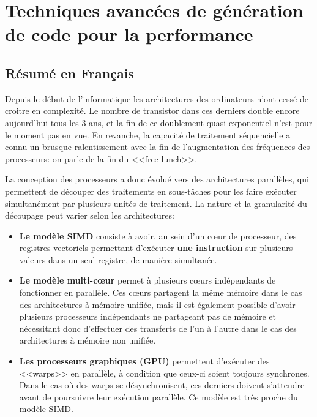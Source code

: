 \documentclass[main]{subfiles}
\begin{document}
\chapter*{Techniques avanc\'ees de g\'en\'eration de code pour la performance}

\section*{R\'esum\'e en Fran\c{c}ais}

Depuis le d\'ebut de l'informatique les architectures des ordinateurs n'ont
cess\'e de croitre en complexit\'e. Le nombre de transistor dans ces derniers
double encore aujourd'hui tous les 3 ans, et la fin de ce doublement
quasi-exponentiel n'est pour le moment pas en vue.
En revanche, la capacit\'e de traitement s\'equencielle a connu un brusque
ralentissement avec la fin de l'augmentation des fr\'equences des processeurs:
on parle de la fin du <<free lunch>>.

La conception des processeurs a donc \'evolu\'e vers des architectures
parall\`eles, qui permettent de d\'ecouper des traitements en sous-t\^aches
pour les faire ex\'ecuter simultan\'ement par plusieurs unit\'es de traitement.
La nature et la granularit\'e du d\'ecoupage peut varier selon les
architectures:

\begin{itemize}
\item
\textbf{Le mod\`ele SIMD} consiste \`a avoir, au sein d'un c\oe{}ur de
processeur, des registres vectoriels permettant d'ex\'ecuter
\textbf{une instruction} sur plusieurs valeurs dans un seul registre,
de mani\`ere simultan\'ee.

\item
\textbf{Le mod\`ele multi-c\oe{}ur} permet \`a plusieurs c\oe{}urs ind\'ependants de
fonctionner en parall\`ele. Ces c\oe{}urs partagent la m\^eme m\'emoire dans le
cas des architectures \`a m\'emoire unifi\'ee, mais il est \'egalement possible
d'avoir plusieurs processeurs ind\'ependants ne partageant pas de m\'emoire
et n\'ecessitant donc d'effectuer des transferts de l'un \`a l'autre dans le cas
des architectures \`a m\'emoire non unifi\'ee.

\item
\textbf{Les processeurs graphiques (GPU)} permettent d'ex\'ecuter des <<warps>> en
parall\`ele, \`a condition que ceux-ci soient toujours synchrones. Dans le cas
o\`u des warps se d\'esynchronisent, ces derniers doivent s'attendre avant de
poursuivre leur ex\'ecution parall\`ele. Ce mod\`ele est tr\`es proche
du mod\`ele SIMD.
\end{itemize}
\end{document}
